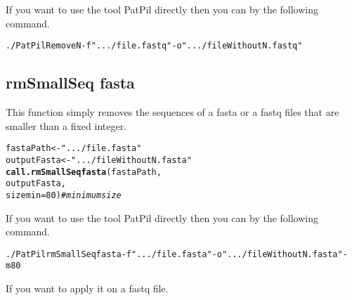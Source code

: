 \documentclass{article}\usepackage[]{graphicx}\usepackage[]{color}
\makeatletter
\newcommand{\hlnum}[1]{\textcolor[rgb]{0.686,0.059,0.569}{#1}}%
\newcommand{\hlstr}[1]{\textcolor[rgb]{0.192,0.494,0.8}{#1}}%
\newcommand{\hlcom}[1]{\textcolor[rgb]{0.678,0.584,0.686}{\textit{#1}}}%
\newcommand{\hlstd}[1]{\textcolor[rgb]{0.345,0.345,0.345}{#1}}%
\newcommand{\hlkwb}[1]{\textcolor[rgb]{0.69,0.353,0.396}{#1}}%
\newcommand{\hlkwc}[1]{\textcolor[rgb]{0.333,0.667,0.333}{#1}}%
\newcommand{\hlkwd}[1]{\textcolor[rgb]{0.737,0.353,0.396}{\textbf{#1}}}%
\newenvironment{kframe}{%
 \def\at@end@of@kframe{}%
 \ifinner\ifhmode%
  \def\at@end@of@kframe{\end{minipage}}%
  \begin{minipage}{\columnwidth}%
 \fi\fi%
 \def\FrameCommand##1{\hskip\@totalleftmargin \hskip-\fboxsep
 \colorbox{shadecolor}{##1}\hskip-\fboxsep
     \hskip-\linewidth \hskip-\@totalleftmargin \hskip\columnwidth}%
 \MakeFramed {\advance\hsize-\width
   \@totalleftmargin\z@ \linewidth\hsize
   \@setminipage}}%
 {\par\unskip\endMakeFramed%
 \at@end@of@kframe}
\newenvironment{knitrout}{}{} %
\makeatother
\begin{document}
If you want to use the tool PatPil directly then you can by the following command.
\begin{knitrout}
\color{fgcolor}\begin{kframe}
\begin{alltt}
./PatPil RemoveN -f \hlstr{".../file.fastq"} -o \hlstr{".../fileWithoutN.fastq"}
\end{alltt}
\end{kframe}
\end{knitrout}


\subsection{rmSmallSeq fasta}



This function simply removes the sequences of a fasta or a fastq files that are smaller than a fixed integer.

\begin{knitrout}
\color{fgcolor}\begin{kframe}
\begin{alltt}
\hlstd{fastaPath} \hlkwb{<-} \hlstr{".../file.fasta"}
\hlstd{outputFasta} \hlkwb{<-} \hlstr{".../fileWithoutN.fasta"}
\hlkwd{call.rmSmallSeqfasta}\hlstd{(fastaPath,}
        \hlstd{outputFasta,}
        \hlkwc{sizemin} \hlstd{=} \hlnum{80}\hlstd{)} \hlcom{# minimum size}
\end{alltt}
\end{kframe}
\end{knitrout}

If you want to use the tool PatPil directly then you can by the following command.
\begin{knitrout}
\color{fgcolor}\begin{kframe}
\begin{alltt}
./PatPil rmSmallSeqfasta -f \hlstr{".../file.fasta"} -o \hlstr{".../fileWithoutN.fasta"} -m 80
\end{alltt}
\end{kframe}
\end{knitrout}

If you want to apply it on a fastq file.
\end{document}
